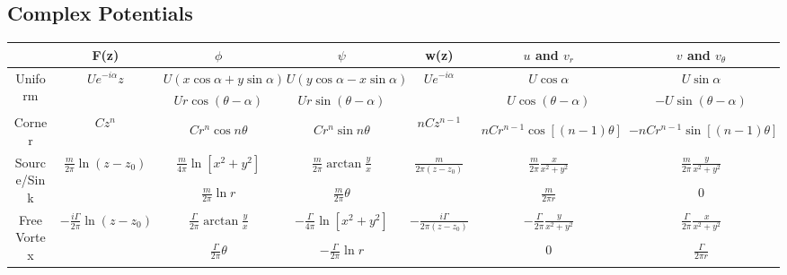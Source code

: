 \documentclass[11pt, letterpaper, notitlepage]{article}
\begin{document}
\subsection{Complex Potentials}

\begin{landscape}

\begin{tabular}{|c|c|c|c|c|c|c|}
\hline & F(z) & $\phi$ & $\psi$ & w(z) & $u$ and $v_r$ & $v$ and $v_{\theta}$ \\

\hline \multirow{2}{*}{Uniform}
  & \multirow{2}{*}{$U e^{-i \alpha} z$} %
    & $U(x \cos{\alpha}+y \sin{\alpha})$ %
    & $U(y \cos{\alpha}-x \sin{\alpha})$ %
  & \multirow{2}{*}{$U e^{-i \alpha}$} %
    & $U \cos{\alpha}$ %
    & $U \sin{\alpha}$ %
  \\ \cline{3-4} \cline{6-7} 
  & 
    & $U r \cos(\theta - \alpha)$ %
    & $U r \sin(\theta - \alpha)$ %
  & 
    & $U \cos(\theta - \alpha)$ %
    & $-U \sin(\theta - \alpha)$ %
\\

\hline \multirow{2}{*}{Corner}
  & \multirow{2}{*}{$C z^n$} %
    & %
    & %
  & \multirow{2}{*}{$n C z^{n-1}$} %
    & %
    & %
  \\ \cline{3-4} \cline{6-7} 
  & 
    & $C r^n \cos{n \theta}$ %
    & $C r^n \sin{n \theta}$ %
  & 
    & $n C r^{n-1} \cos[(n-1) \theta]$ %
    & $- n C r^{n-1} \sin[(n-1) \theta]$ %
\\

\hline \multirow{2}{*}{Source/Sink}
  & \multirow{2}{*}{$\frac{m}{2 \pi} \ln(z - z_0)$} %
    & $\frac{m}{4 \pi} \ln[{x^2+y^2}]$ %
    & $\frac{m}{2 \pi} \arctan{\frac{y}{x}}$ %
  & \multirow{2}{*}{$\frac{m}{2 \pi (z - z_0)}$} %
    & $\frac{m}{2 \pi} \frac{x}{x^2+y^2}$ %
    & $\frac{m}{2 \pi} \frac{y}{x^2+y^2}$ %
  \\ \cline{3-4} \cline{6-7} 
  & 
    & $\frac{m}{2 \pi} \ln{r}$ %
    & $\frac{m}{2 \pi} \theta$ %
  & 
    & $\frac{m}{2 \pi r}$ %
    & $0$ %
\\

\hline \multirow{2}{*}{Free Vortex} %
  & \multirow{2}{*}{$-\frac{i \Gamma}{2 \pi} \ln(z - z_0)$} %
    & $\frac{\Gamma}{2 \pi} \arctan{\frac{y}{x}}$ %
    & $-\frac{\Gamma}{4 \pi} \ln[x^2 + y^2]$ %
  & \multirow{2}{*}{$-\frac{i \Gamma}{2 \pi (z-z_0)}$} %
    & $-\frac{\Gamma}{2 \pi} \frac{y}{x^2 + y^2}$ %
    & $\frac{\Gamma}{2 \pi} \frac{x}{x^2 + y^2}$ %
  \\ \cline{3-4} \cline{6-7} 
  & 
    & $\frac{\Gamma}{2 \pi} \theta$ %
    & $-\frac{\Gamma}{2 \pi} \ln{r}$ %
  & 
    & $0$ %
    & $\frac{\Gamma}{2 \pi r}$ %
\\


\end{tabular}
\end{landscape}
\end{document}

